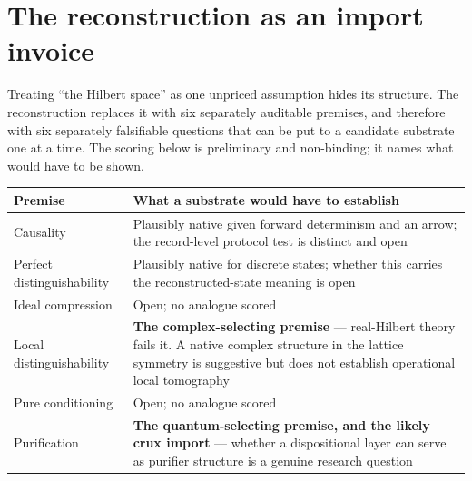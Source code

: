 \documentclass[11pt,a4paper]{article}
\theoremstyle{definition}
\theoremstyle{plain}
\theoremstyle{remark}
\begin{document}
\section{The reconstruction as an import invoice}
\label{app:invoice}

Treating ``the Hilbert space'' as one unpriced assumption hides its
structure. The reconstruction replaces it with six separately auditable
premises, and therefore with six separately falsifiable questions that
can be put to a candidate substrate one at a time. The scoring below is
preliminary and non-binding; it names what would have to be shown.

\begin{table}[h!]
\centering\small
\begin{tabular}{p{} p{}}
\toprule
Premise & What a substrate would have to establish \\
\midrule
Causality & Plausibly native given forward determinism and an arrow; the
record-level protocol test is distinct and open \\
Perfect distinguishability & Plausibly native for discrete states;
whether this carries the reconstructed-state meaning is open \\
Ideal compression & Open; no analogue scored \\
Local distinguishability & \textbf{The complex-selecting premise} ---
real-Hilbert theory fails it. A native complex structure in the lattice
symmetry is suggestive but does not establish operational local
tomography \\
Pure conditioning & Open; no analogue scored \\
Purification & \textbf{The quantum-selecting premise, and the likely crux
import} --- whether a dispositional layer can serve as purifier structure
is a genuine research question \\
\bottomrule
\end{tabular}
\end{table}
\end{document}
